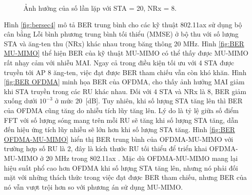 \begin{figure}
	\centering
	
	\caption{Ảnh hưởng của số lần lặp với STA = 20, NRx = 8.}
	\label{fig:IT}
\end{figure}

Hình \ref{fig:bersec4} mô tả BER trung bình cho các kỹ thuật 802.11ax sử dụng bộ cân bằng Lỗi bình phương trung bình tối thiểu (\acrshort{MMSE}) ở bộ thu với số lượng STA và ăng-ten thu (NRx) khác nhau trong băng thông 20 MHz.
Hình \ref{fig:BER MU-MIMO} thể hiện BER của kỹ thuật MU-MIMO có thể thấy được MU-MIMO rất nhạy cảm với nhiễu MAI. Ngay cả trong điều kiện tối ưu với 4 STA được truyền tới AP 8 ăng-ten, việc đạt được BER tham chiếu vẫn còn khó khăn.
Hình \ref{fig:BER OFDMA} minh họa BER của OFDMA, cho thấy ảnh hưởng MAI giảm khi STA truyền trong các RU khác nhau. Đối với 4 STA và NRx là 8, BER giảm xuống dưới $10^{-3}$ ở mức 20~[dB]. Tuy nhiên, khi số lượng STA tăng lên thì BER của OFDMA cũng tăng do nhiễu tích lũy tăng lên. Lý do là tỷ lệ giữa số điểm FFT với số lượng sóng mang trên mỗi RU sẽ tăng khi số lượng STA tăng, dẫn đến hiệu ứng tích lũy nhiễu sẽ lớn hơn khi số lượng STA tăng.
Hình \ref{fig:BER OFDMA-MU-MIMO} hiển thị BER trung bình của OFDMA-MU-MIMO với trường hợp số RU là 2, đây là kích thước RU tối thiểu để triển khai OFDMA-MU-MIMO ở 20 MHz trong 802.11ax \cite{IEEEStd}. Mặc dù OFDMA-MU-MIMO mang lại hiệu suất phổ cao hơn OFDMA khi số lượng STA tăng lên, nhưng nó phải đối mặt với những thách thức trong việc đạt được BER tham chiếu, nhưng BER của nó vẫn vượt trội hơn so với phương án sử dụng MU-MIMO.

